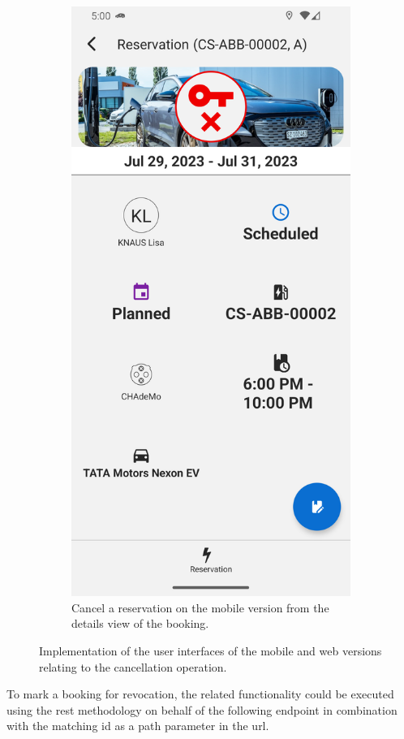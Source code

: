 \begin{figure}[h]
\begin{subfigure}[c]{0.3\textwidth}
        \includegraphics[width=\textwidth,height=1.6\textwidth,keepaspectratio]{resources/images/main/6_implementation/screens/cancel_reservation/mobile/Cancel_Reservation.png}
        \caption{Cancel a reservation on the mobile version from the details view of the booking.}
        \label{fig:mobile-cancel-reservation-impl}
    \end{subfigure}
    \caption{Implementation of the user interfaces of the mobile and web versions relating to the cancellation operation.}
    \label{fig:impl-cancel-reservation}
\end{figure}

\noindent To mark a booking for revocation, the related functionality could be executed using the \acrshort{rest} methodology on behalf of the following endpoint in combination with the matching \acrshort{id} as a path parameter in the \acrshort{url}.

